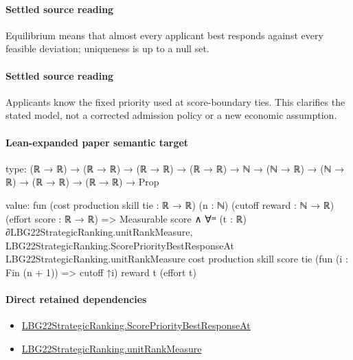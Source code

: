 \documentclass[10pt]{article}
\begin{document}
\paragraph{Settled source reading}
\begin{sloppypar}
Equilibrium means that almost every applicant best responds against every feasible deviation;\allowbreak{} uniqueness is up to a null set.\allowbreak{}
\end{sloppypar}
\paragraph{Settled source reading}
\begin{sloppypar}
Applicants know the fixed priority used at score-\allowbreak{}boundary ties.\allowbreak{} This clarifies the stated model, not a corrected admission policy or a new economic assumption.\allowbreak{}
\end{sloppypar}

\paragraph{Lean-expanded paper semantic target}
\begin{ReviewVerbatim}
type:
(ℝ → ℝ) → (ℝ → ℝ) → (ℝ → ℝ) → (ℝ → ℝ) → ℕ → (ℕ → ℝ) → (ℕ → ℝ) → (ℝ → ℝ) → (ℝ → ℝ) → Prop

value:
fun (cost production skill tie : ℝ → ℝ) (n : ℕ) (cutoff reward : ℕ → ℝ) (effort score : ℝ → ℝ) =>
  Measurable score ∧
    ∀ᵐ (t : ℝ) ∂LBG22StrategicRanking.unitRankMeasure,
      LBG22StrategicRanking.ScorePriorityBestResponseAt LBG22StrategicRanking.unitRankMeasure cost production skill
        score tie (fun (i : Fin (n + 1)) => cutoff ↑i) reward t (effort t)
\end{ReviewVerbatim}

\paragraph{Direct retained dependencies}
\begin{itemize}\raggedright
\item \hyperlink{paper-prerequisite-2dc31b75c00d0d1b}{LBG22\allowbreak{}Strategic\allowbreak{}Ranking.\allowbreak{}Score\allowbreak{}Priority\allowbreak{}Best\allowbreak{}Response\allowbreak{}At}
\item \hyperlink{governing-declaration-678cf48d549cb620}{LBG22\allowbreak{}Strategic\allowbreak{}Ranking.\allowbreak{}unit\allowbreak{}Rank\allowbreak{}Measure}
\end{itemize}
\end{document}
